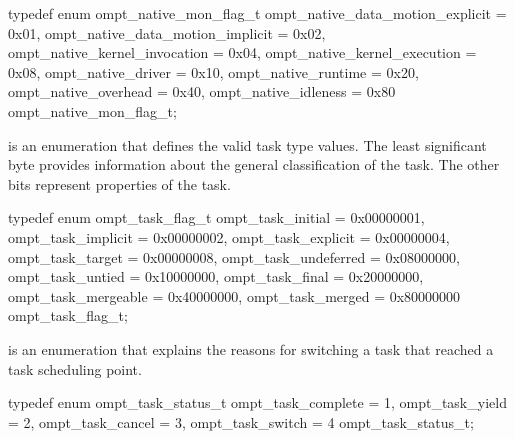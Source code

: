 \begin{ccppspecific}
\begin{omptEnum}
typedef enum ompt_native_mon_flag_t {
  ompt_native_data_motion_explicit    = 0x01,
  ompt_native_data_motion_implicit    = 0x02,
  ompt_native_kernel_invocation       = 0x04,
  ompt_native_kernel_execution        = 0x08,
  ompt_native_driver                  = 0x10,
  ompt_native_runtime                 = 0x20,
  ompt_native_overhead                = 0x40,
  ompt_native_idleness                = 0x80
} ompt_native_mon_flag_t;
\end{omptEnum}
\end{ccppspecific}





\label{sec:ompt_task_flag_t}
 is an enumeration that defines the valid task type values.
The least significant byte provides information about the general classification of the task.
The other bits represent properties of the task.

\begin{ccppspecific}
\begin{omptEnum}
typedef enum ompt_task_flag_t {
  ompt_task_initial                   = 0x00000001,
  ompt_task_implicit                  = 0x00000002,
  ompt_task_explicit                  = 0x00000004,
  ompt_task_target                    = 0x00000008,
  ompt_task_undeferred                = 0x08000000,
  ompt_task_untied                    = 0x10000000,
  ompt_task_final                     = 0x20000000,
  ompt_task_mergeable                 = 0x40000000,
  ompt_task_merged                    = 0x80000000
} ompt_task_flag_t;
\end{omptEnum}
\end{ccppspecific}





\label{sec:ompt_task_status_t}
 is an enumeration that explains the
reasons for switching a task that reached  a task scheduling point.


\begin{ccppspecific}
\begin{omptEnum}
typedef enum ompt_task_status_t {
  ompt_task_complete  = 1,
  ompt_task_yield     = 2,
  ompt_task_cancel    = 3,
  ompt_task_switch    = 4
} ompt_task_status_t;
\end{omptEnum}
\end{ccppspecific}


